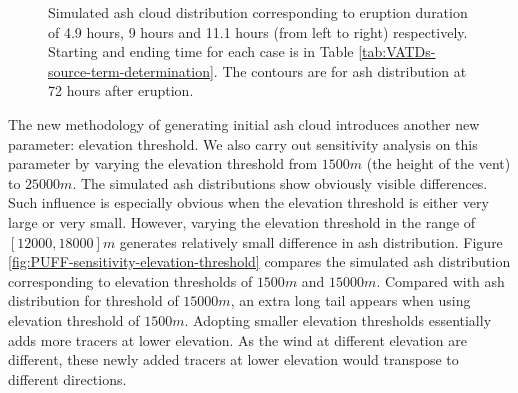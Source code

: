 \begin{figure}[!htb]
\begin{minipage}{.325 \textwidth}
    \end{minipage}%
    \caption{Simulated ash cloud distribution corresponding to eruption duration of 4.9 hours, 9 hours and 11.1 hours (from left to right) respectively. Starting and ending time for each case is in Table \ref{tab:VATDs-source-term-determination}. The contours are for ash distribution at 72 hours after eruption.}
    \label{fig:PUFF-sensitivity-duration}
\end{figure}

The new methodology of generating initial ash cloud introduces another new parameter: elevation threshold. We also carry out sensitivity analysis on this parameter by varying the elevation threshold from $1500 m$ (the height of the vent) to $25000 m$. The simulated ash distributions show obviously visible differences. Such influence is especially obvious when the elevation threshold is either very large or very small. However, varying the elevation threshold in the range of $[12000, 18000] m$ generates relatively small difference in ash distribution. Figure \ref{fig:PUFF-sensitivity-elevation-threshold} compares the simulated ash distribution corresponding to elevation thresholds of $1500 m$ and $15000 m$. Compared with ash distribution for threshold of $15000 m$, an extra long tail appears when using elevation threshold of $1500 m$. Adopting smaller elevation thresholds essentially adds more tracers at lower elevation. As the wind at different elevation are different, these newly added tracers at lower elevation would transpose to different directions.

